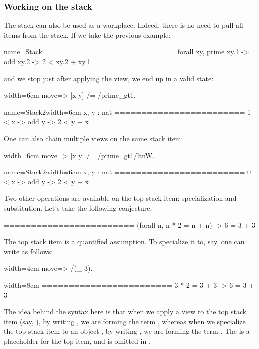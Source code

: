 \subsubsection{Working on the stack}

The stack can also be used as a workplace.  Indeed, there is no need
to pull all items from the stack.  If we take the previous example:

\begin{coqout}{name=Stack}{}
========================
forall xy, prime xy.1 -> odd xy.2 -> 2 < xy.2 + xy.1
\end{coqout}
and we stop just after applying the view, we end up in a valid state:

\begin{coq}{}{width=6cm}
move=> [x y] /= /prime_gt1.
\end{coq}
\begin{coqout}{name=Stack2}{width=6cm}
 x, y : nat
 ========================
 1 < x -> odd y -> 2 < y + x
\end{coqout}

One can also chain multiple views on the same stack item:

\begin{coq}{}{width=6cm}
move=> [x y] /= /prime_gt1/ltnW.
\end{coq}
\begin{coqout}{name=Stack2}{width=6cm}
 x, y : nat
 ========================
 0 < x -> odd y -> 2 < y + x
\end{coqout}

Two other operations are available on the top stack item: specialization
and substitution.  Let's take the following conjecture.

\begin{coqout}{}{}
========================
(forall n, n * 2 = n + n) -> 6 = 3 + 3
\end{coqout}

The top stack item is a quantified assumption.  To specialize it to, say,
 one can write as follows:

\begin{coq}{}{width=4cm}
move=> /(_ 3).
\end{coq}
\begin{coqout}{}{width=8cm}
========================
3 * 2 = 3 + 3 -> 6 = 3 + 3
\end{coqout}
The idea behind the syntax here is that when we apply a view  to
the top stack item (say, ), by writing , we are
forming the term , whereas
when we specialize the top stack item  to an object ,
by writing , we are forming the term .  The \C{_}
is a placeholder for the top item, and is
omitted in .

